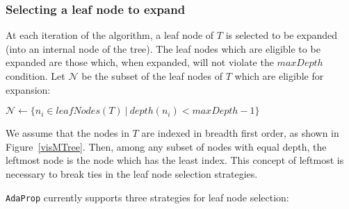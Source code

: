 \documentclass[a4paper,12pt]{article} %
\newcommand{\AdaProp}{\texttt{AdaProp}\xspace}
\newcommand{\mcl}[1]{\mathcal{#1}}
\begin{document}
\subsubsection{Selecting a leaf node to expand}
\label{secTreeBuild}

At each iteration of the algorithm, 
    a leaf node of $T$ is selected to be expanded 
    (into an internal node of the tree).
The leaf nodes which are eligible to be expanded
    are those which, when expanded, will not 
    violate the $maxDepth$ condition.
Let $\mcl{N}$ be the subset of the leaf nodes of $T$ 
    which are eligible for expansion:
\begin{algorithmic}
    \State $\mcl{N} \gets \{ n_i \in leafNodes(T) ~\big|~ depth(n_i) < maxDepth - 1 \} $
\end{algorithmic}
We assume that the nodes in $T$ are indexed in breadth first order, 
    as shown in Figure~\ref{visMTree}.
Then, among any subset of nodes with equal depth,
    the leftmost node is the node which has the least index.
This concept of leftmost is necessary to break ties in the 
    leaf node selection strategies.    
    
\AdaProp currently supports three strategies for leaf node selection:
\end{document}
